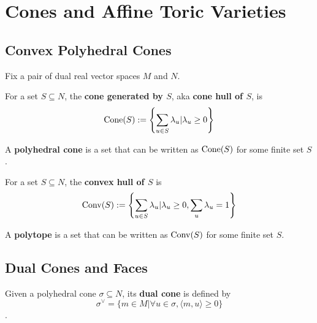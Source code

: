 \section{Cones and Affine Toric Varieties}

\subsection{Convex Polyhedral Cones}

Fix a pair of dual real vector spaces $M$ and $N$.


\begin{definition}
  \label{1-2-1-cone-hull}
  \uses{}
  \leanok

  For a set $S \subseteq N$, the {\bf cone generated by $S$}, aka {\bf cone hull of $S$}, is
  $$\operatorname{Cone}(S) := \left\{\sum_{u \in S} \lambda_u | \lambda_u \ge 0\right\}$$
\end{definition}


\begin{definition}
  \label{1-2-1-polyhedral-cone}

  A {\bf polyhedral cone} is a set that can be written as $\operatorname{Cone}(S)$ for some finite set $S$.
\end{definition}


\begin{definition}
  \label{1-2-2-convex-hull}
  \uses{}
  \leanok

  For a set $S \subseteq N$, the {\bf convex hull of $S$} is
  $$\operatorname{Conv}(S) := \left\{\sum_{u \in S} \lambda_u | \lambda_u \ge 0, \sum_u \lambda_u = 1\right\}$$
\end{definition}


\begin{definition}[Polytope]
  \label{1-2-2-polytope}

  A {\bf polytope} is a set that can be written as $\operatorname{Conv}(S)$ for some finite set $S$.
\end{definition}


\subsection{Dual Cones and Faces}


\begin{definition}
  \label{1-2-3-dual-cone}
  \leanok

  Given a polyhedral cone $\sigma \subseteq N$, its {\bf dual cone} is defined by
  $$\sigma^\vee = \{m \in M | \forall u \in \sigma, \langle m, u\rangle \ge 0\}$$.
\end{definition}


